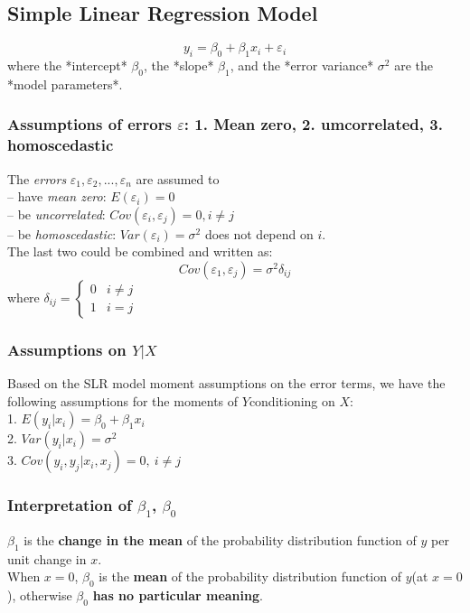 \documentclass[11pt,a4paper]{article}
\begin{document}
\subsection{Simple Linear Regression Model}
$$y_i=\beta_0+\beta_1 x_i+\varepsilon_i $$
where the *intercept* $\beta_0$, the *slope* $\beta_1$, and the *error variance* $\sigma^2$ are the *model parameters*.

\subsubsection{Assumptions of errors $\varepsilon$: 1. Mean zero, 2. umcorrelated, 3. homoscedastic}
The \textit{errors} $\varepsilon_1 , \varepsilon_2 , . . . , \varepsilon_n$ are assumed to\\
– have \textit{mean zero}: $E(\varepsilon_i ) = 0$\\
– be \textit{uncorrelated}: $Cov(\varepsilon_ i , \varepsilon_ j ) = 0, i \neq j$\\
– be \textit{homoscedastic}: $Var(\varepsilon_i ) = \sigma^ 2$ does not depend on $i$.\\

The last two could be combined and written as:
$$Cov(\varepsilon_1,\varepsilon_j)=\sigma^2\delta_{ij}$$
where $\delta_{ij}=\left\{\begin{matrix}
    0&i\neq j\\
    1&i=j
\end{matrix}\right.$

\subsubsection{Assumptions on $Y|X$}
Based on the SLR model moment assumptions on the error terms, we have the following assumptions for the moments of $Y $conditioning on $X$:\\
1. $E(y_i|x_i)=\beta_0+\beta_1x_i$\\
2. $Var(y_i|x_i)=\sigma^2$\\
3. $Cov(y_i,y_j|x_i,x_j)=0,\ i\neq j$
\subsubsection{Interpretation of $\beta_1$, $\beta_0$}
$\beta_1$ is the \textbf{change in the mean} of the probability distribution function of $y$ per unit change in $x$.\\
When $x=0$, $\beta_0$ is the \textbf{mean} of the probability distribution function of $y$(at $x=0$), otherwise $\beta_0$ \textbf{has no particular meaning}.\\
\end{document}
